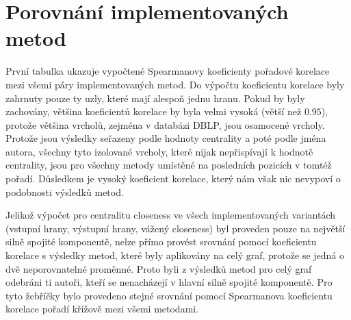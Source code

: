 \documentclass[12pt,titlepage]{report}
\begin{document}
\section{Porovnání implementovaných metod}
První tabulka ukazuje vypočtené Spearmanovy koeficienty pořadové korelace mezi
všemi páry implementovaných metod. Do výpočtu koeficientu korelace byly
zahrnuty pouze ty uzly, které mají alespoň jednu hranu. Pokud by byly
zachovány, většina koeficientů korelace by byla velmi vysoká (větší než
$0.95$), protože většina vrcholů, zejména v databázi DBLP, jsou osamocené
vrcholy. Protože jsou výsledky seřazeny podle hodnoty centrality a poté podle
jména autora, všechny tyto izolované vrcholy, které nijak nepřispívají k
hodnotě centrality, jsou pro všechny metody umístěné na posledních pozicích v
tomtéž pořadí. Důsledkem je vysoký koeficient korelace, který nám však nic
nevypoví o podobnosti výsledků metod.

Jelikož výpočet pro centralitu closeness ve všech implementovaných variantách
(vstupní hrany, výstupní hrany, vážený closeness) byl proveden pouze na
největší silně spojité komponentě, nelze přímo provést srovnání pomocí
koeficientu korelace s výsledky metod, které byly aplikovány na celý graf,
protože se jedná o dvě neporovnatelné proměnné. Proto byli z výsledků metod pro
celý graf odebráni ti autoři, kteří se nenacházejí v hlavní silně spojité
komponentě. Pro tyto žebříčky bylo provedeno stejné srovnání pomocí Spearmanova
koeficientu korelace pořadí křížově mezi všemi metodami.

\end{document}

